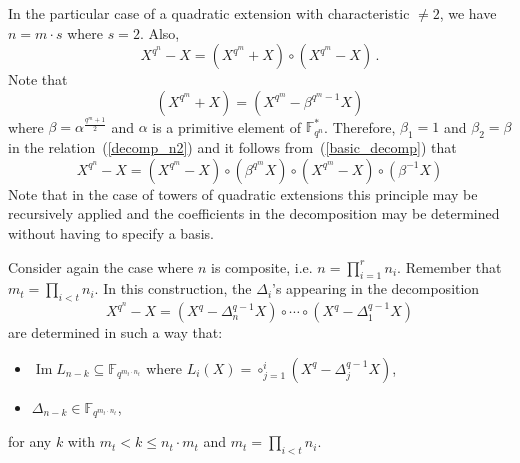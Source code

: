 \documentclass{sig-alternate}
\newcommand{\ff}[1]{\mathbb{F}_{#1}}
\newcommand{\qq}{q}
\newcommand{\nn}{n}
\newcommand{\qn}{{\qq^\nn}}
\newcommand{\extf}{\ff{\qn}}
\DeclareMathOperator{\Ima}{Im}
\begin{document}
\medskip

 In the particular case of a quadratic extension with characteristic $\ne 2$, we have $n=m \cdot s$ where $s=2$. Also,
$$X^{\qq^\nn}-X=(X^{\qq^{m}}+X)  \circ (X^{\qq^{m}}-X)  \,.$$
Note that 
$$(X^{\qq^{m}}+X)=(X^{\qq^{m}} - \beta^{\qq^{m}-1} X)$$
 where $\beta=\alpha^{\frac{\qq^{m}+1}{2}}$ and $\alpha$ is a primitive element of $\extf^\ast$.
Therefore, $\beta_1=1$ and $\beta_2=\beta$ in the relation~(\ref{decomp_n2}) and it follows from~(\ref{basic_decomp}) that
$$X^{\qq^\nn}-X=(X^{\qq^{m}}-X) \circ  (\beta^{\qq^{m}} X) \circ (X^{\qq^{m}}-X) \circ  (\beta^{-1} X) $$
Note that in the case of towers of quadratic extensions this principle may be recursively applied and the coefficients in the decomposition may be determined without having to specify a basis.

\medskip


 Consider again the case where $\nn$ is composite, i.e. $n=\prod_{i=1}^r n_i$. Remember that $m_t =\prod_{i <t} n_i$. In this construction, the $\Delta_i$'s appearing in the decomposition
$$X^{\qq^\nn}-X=(X^\qq-\Delta_n^{\qq-1} X) \circ  \cdots \circ (X^\qq-\Delta_1^{\qq-1} X) $$
are determined in such a way that:
\begin{itemize}
\item $\Ima L_{n-k} \subseteq \mathbb{F}_{\qq^{m_t \cdot n_t}}$ where $L_{i}(X)=\circ_{j=1}^{i} (X^q-\Delta_j^{q-1} X)$,
\item $\Delta_{n-k} \in \mathbb{F}_{\qq^{m_t \cdot n_t}}$,
\end{itemize}
for any $k$ with $m_{t}< k \le n_t \cdot m_{t}$ and $m_t=\prod_{i < t} n_i$.

\medskip
\end{document}
